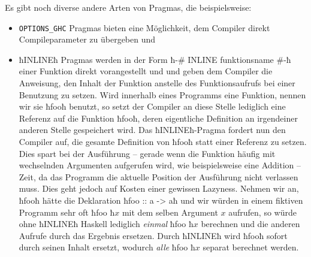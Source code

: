 Es gibt noch diverse andere Arten von Pragmas, die beispielsweise:
\begin{itemize}
  \item \texttt{OPTIONS\_GHC} Pragmas bieten eine Möglichkeit, dem Compiler
    direkt Compileparameter zu übergeben und
  \item ħINLINEħ Pragmas werden in der Form
    ħ{-# INLINE funktionsname #-}ħ einer Funktion direkt vorangestellt und 
    und geben dem Compiler die Anweisung, den Inhalt der Funktion anstelle des
    Funktionsaufrufs bei einer Benutzung zu setzen. Wird innerhalb eines
    Programms eine Funktion, nennen wir sie ħfooħ benutzt, so setzt der
    Compiler an diese Stelle lediglich eine Referenz auf die Funktion ħfooħ,
    deren eigentliche Definition an irgendeiner anderen Stelle gespeichert wird.
    Das ħINLINEħ-Pragma fordert nun den Compiler auf, die gesamte Definition 
    von ħfooħ statt einer Referenz zu setzen. Dies spart
    bei der Ausführung -- gerade wenn die Funktion häufig mit wechselnden
    Argumenten aufgerufen wird, wie
    beispielsweise eine Addition -- Zeit, da das Programm die aktuelle Position
    der Ausführung nicht verlassen muss. Dies geht jedoch auf Kosten einer gewissen
    Lazyness. Nehmen wir an, ħfooħ hätte die Deklaration ħfoo :: a -> aħ und wir
    würden in einem fiktiven Programm sehr oft ħfoo ħ$x$ mit dem selben Argument
    $x$ aufrufen, so würde ohne ħINLINEħ Haskell lediglich \emph{einmal}
    ħfoo ħ$x$ berechnen und die anderen Aufrufe durch das Ergebnis ersetzen.
    Durch ħINLINEħ wird ħfooħ sofort durch seinen Inhalt ersetzt, wodurch 
    \emph{alle} ħfoo ħ$x$ separat berechnet werden. 
\end{itemize}
